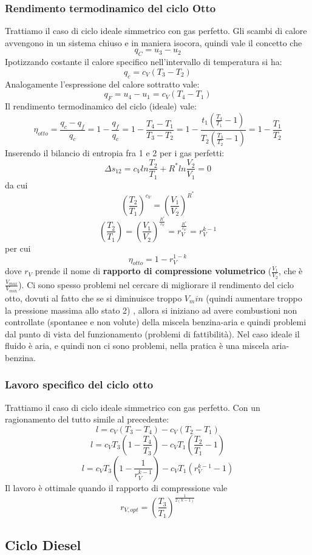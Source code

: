 \subsubsection{Rendimento termodinamico del ciclo Otto}
Trattiamo il caso di ciclo ideale simmetrico con gas perfetto.\newline
Gli scambi di calore avvengono in un sistema chiuso e in maniera isocora, quindi vale il concetto che
\[
    q_C = u_3- u_2
\]
Ipotizzando costante il calore specifico nell'intervallo di temperatura si ha:
\[
    q_c = c_V(T_3-T_2)
\]
Analogamente l'espressione del calore sottratto vale:
\[
    q_F = u_4-u_1 = c_V(T_4-T_1)
\]
Il rendimento termodinamico del ciclo (ideale) vale:
\[
    \eta_{otto} = \frac{q_c - q_f}{q_c} = 1- \frac{q_f}{q_c} = 1- \frac{T_4-T_1}{T_3-T_2} = 1- \frac{t_1 \left(\frac{T_4}{T_1}-1\right)}{T_2 \left(\frac{T_3}{T_2}-1\right)} = 1- \frac{T_1}{T_2}
\]
Inserendo il bilancio di entropia fra 1 e 2 per i gas perfetti:
\[
    \Delta s_{12} = c_V ln \frac{T_2}{T_1} + R^* ln \frac{V_2}{V_1} = 0
\]
da cui 
\[
    \left(\frac{T_2}{T_1}\right)^{c_V} = \left(\frac{V_1}{V_2}\right)^{R^*}
\]
\[
    \left(\frac{T_2}{T_1}\right) = \left(\frac{V_1}{V_2}\right)^{\frac{R^*}{c_V}} = r_V^{\frac{R^*}{c_V}} = r_V^{k-1}
\]
per cui
\[
    \eta_{otto} = 1- r_V^{1-k}
\]
dove $r_V$ prende il nome di \textbf{rapporto di compressione volumetrico} ($\frac{V_1}{V_2}$, che è $\frac{V_{max}}{V_{min}}$).\newline
\newline
Ci sono spesso problemi nel cercare di migliorare il rendimento del ciclo otto, dovuti al fatto che se si diminuisce troppo $V_min$ (quindi aumentare troppo la pressione massima allo stato 2) , allora si iniziano ad avere combustioni non controllate (spontanee e non volute) della miscela benzina-aria e quindi problemi dal punto di vista del funzionamento (problemi di fattibilità). Nel caso ideale il fluido è aria, e quindi non ci sono problemi, nella pratica è una miscela aria-benzina.
\subsubsection{Lavoro specifico del ciclo otto}
Trattiamo il caso di ciclo ideale simmetrico con gas perfetto.\newline
Con un ragionamento del tutto simile al precedente:
\[
    l = c_V(T_3-T_4) -c_V(T_2-T_1)
\]
\[
    l = c_VT_3\left(1-\frac{T_4}{T_3}\right) - c_V T_1 \left(\frac{T_2}{T_1}-1 \right)
\]
\[
    l = c_V T_3 \left(1- \frac{1}{r_V^{k-1}}\right) - c_V T_1 (r_V^{k-1} - 1)
\]
Il lavoro è ottimale quando il rapporto di compressione vale
\[
    r_{V,opt} = \left(\frac{T_3}{T_1}\right)^{\frac{1}{2(k-1)}}
\]
\subsection{Ciclo Diesel}
